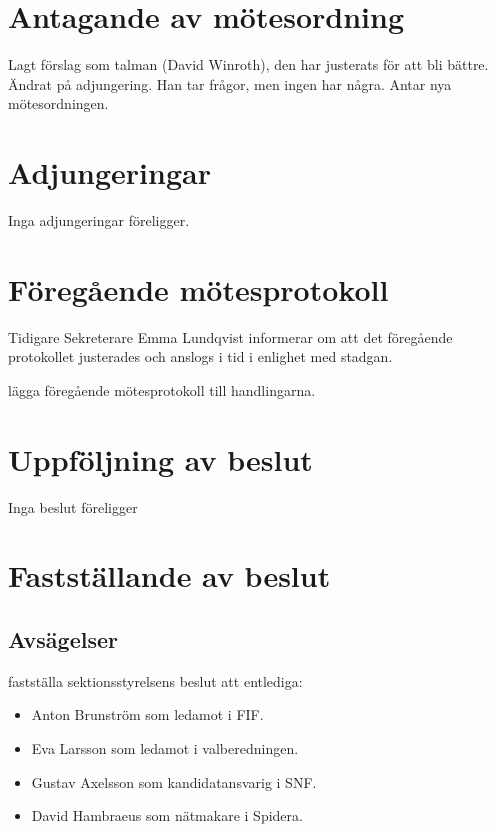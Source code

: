 \documentclass{sektionsmote}
\begin{document}
\section{Antagande av mötesordning}
Lagt förslag som talman (David Winroth), den har justerats för att bli bättre. Ändrat på adjungering. Han tar frågor, men ingen har några.
Antar nya mötesordningen.

\section{Adjungeringar}
Inga adjungeringar föreligger.


\section{Föregående mötesprotokoll}
Tidigare Sekreterare Emma Lundqvist informerar om att det föregående protokollet justerades och anslogs i tid i enlighet med stadgan.
\begin{beslut}
    \item lägga föregående mötesprotokoll till handlingarna. 
\end{beslut}


\section{Uppföljning av beslut}
Inga beslut föreligger


\section{Fastställande av beslut}

\subsection{Avsägelser}
\begin{beslut}
    \item fastställa sektionsstyrelsens beslut att entlediga:
    \begin{itemize}
        \item Anton Brunström som ledamot i FIF.
        \item Eva Larsson som ledamot i valberedningen.
        \item Gustav Axelsson som kandidatansvarig i SNF.
        \item David Hambraeus som nätmakare i Spidera.
    \end{itemize}
\end{beslut}
\end{document}
